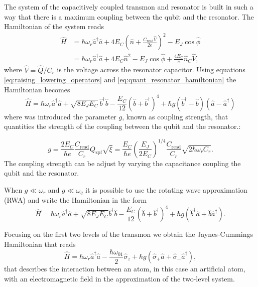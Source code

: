 The system of the capacitively coupled transmon and resonator is built in such a way that there is a maximum coupling between the qubit and the resonator.
The Hamiltonian of the system reads
\begin{align}
    \hat{H} &= \hbar \omega_r \hat{a}^\dagger \hat{a} + 4E_C (\hat{n} + \frac{C_{\text{read}}\hat{V}}{2e})^2- E_J \cos\hat{\phi}\\ 
    &= \hbar \omega_r \hat{a}^\dagger \hat{a} + 4E_C \hat{n}^2 - E_J \cos\hat{\phi} + \frac{4E_C}{e} \hat{n}_C \hat{V},
\end{align}
where $\hat{V} = \hat{Q}/C_r$ is the voltage across the resonator capacitor. Using equations \ref{eq:raising_lowering_operators} and \ref{eq:quant_resonator_hamiltonian} the Hamiltonian becomes
\begin{equation}
    \hat{H} = \hbar \omega_r \hat{a}^\dagger \hat{a}  + \sqrt{8 E_J E_C} \, \hat{b}^\dagger \hat{b} - \frac{E_C}{12} (\hat{b} + \hat{b}^\dagger)^4 + \hbar g (\hat{b}^\dagger - \hat{b})(\hat{a} - \hat{a}^\dagger)
\end{equation}
where was introduced the parameter $g$, known as coupling strength, that quantities the strength of the coupling between the qubit and the resonator.:

\begin{equation}
    g = \frac{2 E_C}{\hbar e} \frac{C_{\text{read}}}{C_r} Q_{\text{zpf}} \sqrt{\xi} = \frac{E_C}{\hbar e} \left( \frac{E_J}{2 E_C} \right)^{1/4} \frac{C_{\text{read}}}{C_r} \sqrt{2 \hbar \omega_r C_r}.
\end{equation} 
The coupling strength can be adjust by varying the capacitance coupling the qubit and the resonator.

When $g\ll\omega_r$ and $g\ll\omega_q$ it is possible to use the rotating wave approximation (RWA) and write the Hamiltonian in the form
\begin{equation}
    \hat{H} = \hbar \omega_r \hat{a}^\dagger \hat{a} + \sqrt{8E_J E_C} \hat{b}^\dagger \hat{b} - \frac{E_C}{12} (\hat{b} + \hat{b}^\dagger)^4 + \hbar g (\hat{b}^\dagger \hat{a} + \hat{b} \hat{a}^\dagger).
\end{equation}

Focusing on the first two levels of the transmon we obtain the Jaynes-Cummings Hamiltonian that reads
\begin{equation}\label{eq:Jaynes-Cummings}
    \hat{H} = \hbar \omega_r \hat{a}^\dagger \hat{a} - \frac{\hbar \omega_{01}}{2} \hat{\sigma}_z + \hbar g (\hat{\sigma}_+ \hat{a} + \hat{\sigma}_- \hat{a}^\dagger),
\end{equation}
that describes the interaction between an atom, in this case an artificial atom, with an electromagnetic field in the approximation of the two-level system.

